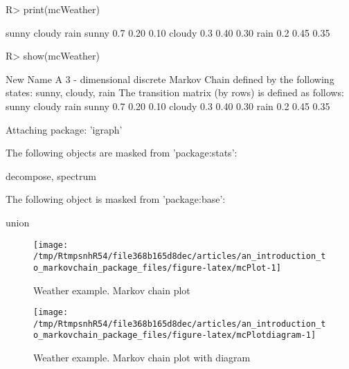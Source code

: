 \documentclass[
  nojss]{jss}
\begin{document}
\begin{CodeChunk}

\begin{CodeInput}
R> print(mcWeather)
\end{CodeInput}

\begin{CodeOutput}
       sunny cloudy rain
sunny    0.7   0.20 0.10
cloudy   0.3   0.40 0.30
rain     0.2   0.45 0.35
\end{CodeOutput}

\begin{CodeInput}
R> show(mcWeather)
\end{CodeInput}

\begin{CodeOutput}
New Name 
 A  3 - dimensional discrete Markov Chain defined by the following states: 
 sunny, cloudy, rain 
 The transition matrix  (by rows)  is defined as follows: 
       sunny cloudy rain
sunny    0.7   0.20 0.10
cloudy   0.3   0.40 0.30
rain     0.2   0.45 0.35
\end{CodeOutput}
\end{CodeChunk}

\begin{CodeChunk}

\begin{CodeOutput}

Attaching package: 'igraph'
\end{CodeOutput}

\begin{CodeOutput}
The following objects are masked from 'package:stats':

    decompose, spectrum
\end{CodeOutput}

\begin{CodeOutput}
The following object is masked from 'package:base':

    union
\end{CodeOutput}
\begin{figure}

{\centering \texttt{[image: /tmp/RtmpsnhR54/file368b165d8dec/articles/an\_introduction\_to\_markovchain\_package\_files/figure-latex/mcPlot-1]} 

}

\caption[Weather example]{Weather example. Markov chain plot}\label{fig:mcPlot}
\end{figure}
\end{CodeChunk}

\begin{CodeChunk}
\begin{figure}

{\centering \texttt{[image: /tmp/RtmpsnhR54/file368b165d8dec/articles/an\_introduction\_to\_markovchain\_package\_files/figure-latex/mcPlotdiagram-1]} 

}

\caption[Weather example]{Weather example. Markov chain plot with diagram}\label{fig:mcPlotdiagram}
\end{figure}
\end{CodeChunk}
\end{document}
